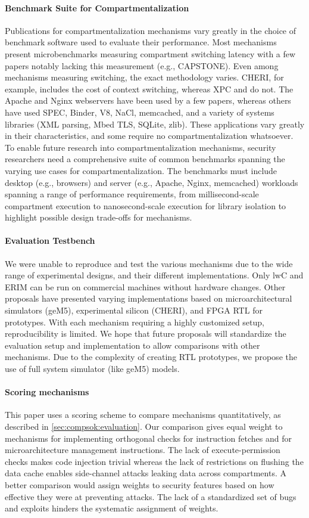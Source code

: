 \paragraph{Benchmark Suite for Compartmentalization}
Publications for compartmentalization mechanisms vary greatly in the
choice of benchmark software used to evaluate their performance.
Most mechanisms present microbenchmarks measuring compartment switching 
latency with a few papers notably lacking this measurement (e.g., CAPSTONE).
Even among mechanisms measuring switching, the exact methodology varies.
CHERI, for example, includes the cost of context switching, whereas XPC and
\seccells do not.
The Apache and Nginx webservers have been used by a few 
papers, whereas others have used SPEC, Binder, V8, NaCl, memcached, and a 
variety of systems libraries (XML parsing, Mbed TLS, SQLite, zlib).
These applications vary greatly in their characteristics, and some require
no compartmentalization whatsoever.
To enable future research into compartmentalization mechanisms, 
security researchers need a comprehensive suite of common benchmarks
spanning the varying use cases for compartmentalization.
The benchmarks must include desktop (e.g., browsers) and 
server (e.g., Apache, Nginx, memcached) workloads spanning a range of
performance requirements, from millisecond-scale compartment execution to
nanosecond-scale execution for library isolation to highlight possible 
design trade-offs for mechanisms.

\paragraph{Evaluation Testbench}
We were unable to reproduce and test the various mechanisms due to the
wide range of experimental designs, and their different implementations.
Only lwC and ERIM can be run on commercial machines without hardware changes.
Other proposals have presented varying implementations based on
microarchitectural simulators (geM5), experimental silicon (CHERI), and
FPGA RTL for prototypes.
With each mechanism requiring a highly customized setup, reproducibility is
limited.
We hope that future proposals will standardize the evaluation setup and 
implementation to allow comparisons with other mechanisms.
Due to the complexity of creating RTL prototypes, we propose the use of 
full system simulator (like geM5) models.

\paragraph{Scoring mechanisms}
This paper uses a scoring scheme to compare mechanisms quantitatively, as
described in \autoref{sec:compsok:evaluation}. 
Our comparison gives equal weight to mechanisms for implementing
orthogonal checks for instruction fetches and for microarchitecture 
management instructions.
The lack of execute-permission checks makes code injection trivial whereas the
lack of restrictions on flushing the data cache enables side-channel attacks
leaking data across compartments. 
A better comparison would assign weights to security features based on how
effective they were at preventing attacks.
The lack of a standardized set of bugs and exploits hinders the systematic
assignment of weights.

